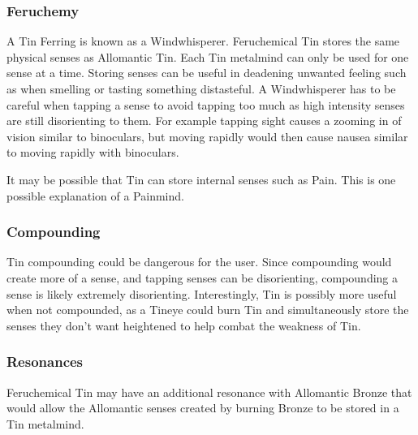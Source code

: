 \documentclass[conference]{IEEEtran}
\begin{document}
\subsubsection*{\textbf{Feruchemy}}
A Tin Ferring is known as a Windwhisperer.\cite{ARS}  Feruchemical Tin stores the same physical senses as Allomantic Tin.  Each Tin metalmind can only be used for one sense at a time.\cite{ARS}  Storing senses can be useful in deadening unwanted feeling such as when smelling or tasting something distasteful.\cite{WoA-CH15} 
A Windwhisperer has to be careful when tapping a sense to avoid tapping too much as high intensity senses are still disorienting to them.  For example tapping sight causes a zooming in of vision similar to binoculars,\cite{WoA-CH19} but moving rapidly would then cause nausea similar to moving rapidly with binoculars. 

It may be possible that Tin can store internal senses such as Pain.  This is one possible explanation of a Painmind.\cite{TLM-CH34}\\
\subsubsection*{\textbf{Compounding}}
Tin compounding could be dangerous for the user.  Since compounding would create more of a sense, and tapping senses can be disorienting, compounding a sense is likely extremely disorienting.  Interestingly, Tin is possibly more useful when not compounded, as a Tineye could burn Tin and simultaneously store the senses they don't want heightened to help combat the weakness of Tin.\\
\subsubsection*{\textbf{Resonances}}
Feruchemical Tin may have an additional resonance with Allomantic Bronze that would allow the Allomantic senses created by burning Bronze to be stored in a Tin metalmind.\cite{seeker-store}\\
\end{document}
